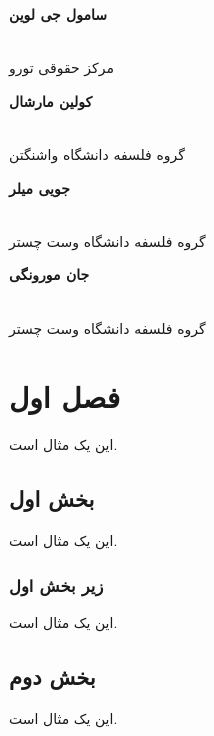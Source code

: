 \documentclass[12pt,oneside]{book}
\begin{document}
    \begin{flushright}
        \begin{Large}
            \textbf{سامول جی لوین}
        \end{Large}
        \\
        مرکز حقوقی تورو
    \end{flushright}

    \begin{flushright}
        \begin{Large}
            \textbf{کولین مارشال}
        \end{Large}
        \\
        گروه فلسفه دانشگاه واشنگتن
    \end{flushright}

    \begin{flushright}
        \begin{Large}
            \textbf{جویی میلر}
        \end{Large}
        \\
        گروه فلسفه دانشگاه وست چستر
    \end{flushright}

    \begin{flushright}
        \begin{Large}
            \textbf{جان مورونگی}
        \end{Large}
        \\
        گروه فلسفه دانشگاه وست چستر
    \end{flushright}


    \chapter{فصل اول}

    این یک مثال است.


    \section{بخش اول}\label{sec:-}

    این یک مثال است.

    \subsection{زیر بخش اول}

    این یک مثال است.


    \section{بخش دوم}

    این یک مثال است.

    \backmatter
\end{document}
